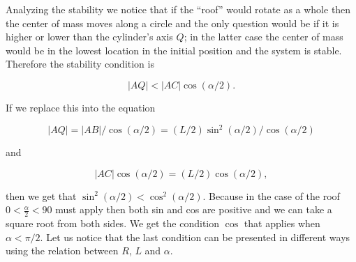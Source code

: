 \documentclass[11pt]{article}
\begin{document}
Analyzing the stability we notice that if the “roof” would rotate as a whole then the center of mass moves along a circle and the only question would be if it is higher or lower than the cylinder’s axis $Q$; in the latter case the center of mass would be in the lowest location in the initial position and the system is stable. Therefore the stability condition is

$$|AQ|<|AC|\cos(\alpha/2).$$

If we replace this into the equation

$$|AQ|=|AB|/\cos(\alpha/2)=(L/2)\sin^2(\alpha/2)/\cos(\alpha/2)$$

and 

$$|AC|\cos(\alpha/2)=(L/2)\cos(\alpha/2),$$

then we get that $\sin^2(\alpha /2) < \cos ^2(\alpha /2)$. Because in the case of the roof $0<\frac{\alpha}{2}<90$ must apply then both sin and cos are positive and we can take a square root from both sides. We get the condition $\cos$ that applies when $\alpha<\pi/2$. Let us notice that the last condition can be presented in different ways using the relation between $R$, $L$ and $\alpha$.
\probend
\bigskip

\end{document}
